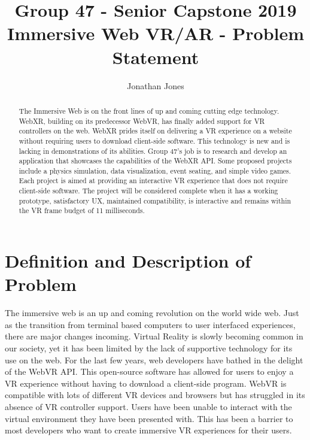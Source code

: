 \documentclass[10pt,letterpaper,draftclsnofoot,onecolumn]{IEEEtran}
\begin{document}
\begin{singlespace}
\begin{titlepage}
\title{Group 47 - Senior Capstone 2019\protect\\Immersive Web VR/AR - Problem Statement}
\author{Jonathan Jones}
\maketitle
\begin{abstract}
The Immersive Web is on the front lines of up and coming cutting edge technology. WebXR, building on its predecessor WebVR, has finally added support for VR controllers on the web. WebXR prides itself on delivering a VR experience on a website without requiring users to download client-side software. This technology is new and is lacking in demonstrations of its abilities. Group 47’s job is to research and develop an application that showcases the capabilities of the WebXR API. Some proposed projects include a physics simulation, data visualization, event seating, and simple video games. Each project is aimed at providing an interactive VR experience that does not require client-side software. The project will be considered complete when it has a working prototype, satisfactory UX, maintained compatibility, is interactive and remains within the VR frame budget of 11 milliseconds.
\end{abstract}
\thispagestyle{empty}
\end{titlepage}

\section{Definition and Description of Problem}
The immersive web is an up and coming revolution on the world wide web. Just as the transition from terminal based computers to user interfaced experiences, there are major changes incoming. Virtual Reality is slowly becoming common in our society, yet it has been limited by the lack of supportive technology for its use on the web. For the last few years, web developers have bathed in the delight of the WebVR API. This open-source software has allowed for users to enjoy a VR experience without having to download a client-side program. WebVR is compatible with lots of different VR devices and browsers but has struggled in its absence of VR controller support. Users have been unable to interact with the virtual environment they have been presented with. This has been a barrier to most developers who want to create immersive VR experiences for their users.


\end{singlespace}
\end{document}
